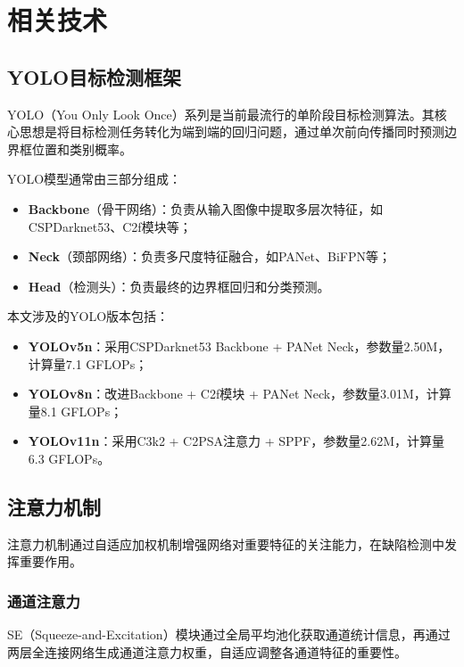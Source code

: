 \documentclass[12pt,a4paper]{article}
\begin{document}
\section{相关技术}

\subsection{YOLO目标检测框架}

YOLO（You Only Look Once）系列是当前最流行的单阶段目标检测算法。其核心思想是将目标检测任务转化为端到端的回归问题，通过单次前向传播同时预测边界框位置和类别概率。

YOLO模型通常由三部分组成：
\begin{itemize}[noitemsep]
  \item \textbf{Backbone}（骨干网络）：负责从输入图像中提取多层次特征，如CSPDarknet53、C2f模块等；
  \item \textbf{Neck}（颈部网络）：负责多尺度特征融合，如PANet、BiFPN等；
  \item \textbf{Head}（检测头）：负责最终的边界框回归和分类预测。
\end{itemize}

本文涉及的YOLO版本包括：
\begin{itemize}[noitemsep]
  \item \textbf{YOLOv5n}：采用CSPDarknet53 Backbone + PANet Neck，参数量2.50M，计算量7.1 GFLOPs；
  \item \textbf{YOLOv8n}：改进Backbone + C2f模块 + PANet Neck，参数量3.01M，计算量8.1 GFLOPs；
  \item \textbf{YOLOv11n}：采用C3k2 + C2PSA注意力 + SPPF，参数量2.62M，计算量6.3 GFLOPs。
\end{itemize}

\subsection{注意力机制}

注意力机制通过自适应加权机制增强网络对重要特征的关注能力，在缺陷检测中发挥重要作用。

\subsubsection{通道注意力}
SE（Squeeze-and-Excitation）模块通过全局平均池化获取通道统计信息，再通过两层全连接网络生成通道注意力权重，自适应调整各通道特征的重要性。
\end{document}
